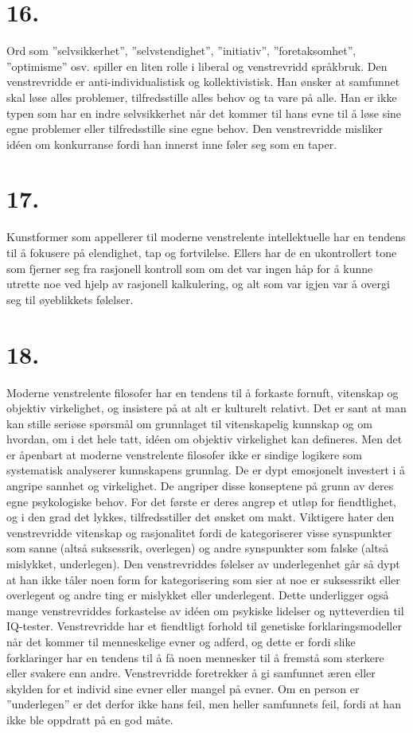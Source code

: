 \documentclass[oneside]{book}
\begin{document}
\section*{16.}
Ord som ''selvsikkerhet'', ''selvstendighet'', ''initiativ'', ''foretaksomhet'', ''optimisme'' osv. spiller en liten rolle i liberal og venstrevridd språkbruk. Den venstrevridde er anti-individualistisk og kollektivistisk. Han ønsker at samfunnet skal løse alles problemer, tilfredsstille alles behov og ta vare på alle. Han er ikke typen som har en indre selvsikkerhet når det kommer til hans evne til å løse sine egne problemer eller tilfredsstille sine egne behov. Den venstrevridde misliker idéen om konkurranse fordi han innerst inne føler seg som en taper.

\section*{17.}
Kunstformer som appellerer til moderne venstrelente intellektuelle har en tendens til å fokusere på elendighet, tap og fortvilelse. Ellers har de en ukontrollert tone som fjerner seg fra rasjonell kontroll som om det var ingen håp for å kunne utrette noe ved hjelp av rasjonell kalkulering, og alt som var igjen var å overgi seg til øyeblikkets følelser.

\section*{18.}
Moderne venstrelente filosofer har en tendens til å forkaste fornuft, vitenskap og objektiv virkelighet, og insistere på at alt er kulturelt relativt. Det er sant at man kan stille seriøse spørsmål om grunnlaget til vitenskapelig kunnskap og om hvordan, om i det hele tatt, idéen om objektiv virkelighet kan defineres. Men det er åpenbart at moderne venstrelente filosofer ikke er sindige logikere som systematisk analyserer kunnskapens grunnlag. De er dypt emosjonelt investert i å angripe sannhet og virkelighet. De angriper disse konseptene på grunn av deres egne psykologiske behov. For det første er deres angrep et utløp for fiendtlighet, og i den grad det lykkes, tilfredsstiller det ønsket om makt. Viktigere hater den venstrevridde vitenskap og rasjonalitet fordi de kategoriserer visse synspunkter som sanne (altså suksessrik, overlegen) og andre synspunkter som falske (altså mislykket, underlegen). Den venstrevriddes følelser av underlegenhet går så dypt at han ikke tåler noen form for kategorisering som sier at noe er suksessrikt eller overlegent og andre ting er mislykket eller underlegent. Dette underligger også mange venstrevriddes forkastelse av idéen om psykiske lidelser og nytteverdien til IQ-tester. Venstrevridde har et fiendtligt forhold til genetiske forklaringsmodeller når det kommer til menneskelige evner og adferd, og dette er fordi slike forklaringer har en tendens til å få noen mennesker til å fremstå som sterkere eller svakere enn andre. Venstrevridde foretrekker å gi samfunnet æren eller skylden for et individ sine evner eller mangel på evner. Om en person er ''underlegen'' er det derfor ikke hans feil, men heller samfunnets feil, fordi at han ikke ble oppdratt på en god måte.
\end{document}
